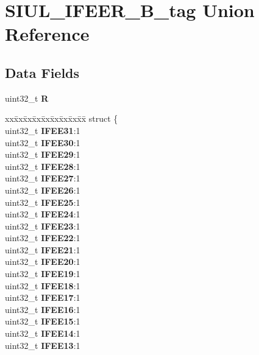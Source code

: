 \hypertarget{unionSIUL__IFEER__32B__tag}{}\section{S\+I\+U\+L\+\_\+\+I\+F\+E\+E\+R\+\_\+B\+\_\+tag Union Reference}
\label{unionSIUL__IFEER__32B__tag}
\subsection*{Data Fields}
\begin{DoxyCompactItemize}
\item 
\mbox{\label{unionSIUL__IFEER__32B__tag_ad87e05edc0d138ba2e843e4286bcbacb}} 
uint32\+\_\+t {\bfseries R}
\item 
\mbox{\label{unionSIUL__IFEER__32B__tag_adac913679048c956f1b7f2a58ce7d2fe}} 
\begin{tabbing}
xx\=xx\=xx\=xx\=xx\=xx\=xx\=xx\=xx\=\kill
struct \{\\
\>uint32\_t {\bfseries IFEE31}:1\\
\>uint32\_t {\bfseries IFEE30}:1\\
\>uint32\_t {\bfseries IFEE29}:1\\
\>uint32\_t {\bfseries IFEE28}:1\\
\>uint32\_t {\bfseries IFEE27}:1\\
\>uint32\_t {\bfseries IFEE26}:1\\
\>uint32\_t {\bfseries IFEE25}:1\\
\>uint32\_t {\bfseries IFEE24}:1\\
\>uint32\_t {\bfseries IFEE23}:1\\
\>uint32\_t {\bfseries IFEE22}:1\\
\>uint32\_t {\bfseries IFEE21}:1\\
\>uint32\_t {\bfseries IFEE20}:1\\
\>uint32\_t {\bfseries IFEE19}:1\\
\>uint32\_t {\bfseries IFEE18}:1\\
\>uint32\_t {\bfseries IFEE17}:1\\
\>uint32\_t {\bfseries IFEE16}:1\\
\>uint32\_t {\bfseries IFEE15}:1\\
\>uint32\_t {\bfseries IFEE14}:1\\
\>uint32\_t {\bfseries IFEE13}:1\\

\end{tabbing}
\end{DoxyCompactItemize}
